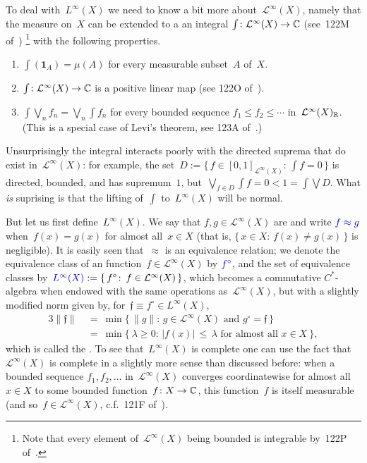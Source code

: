 \documentclass[a]{subfiles}
\begin{document}
\begin{parsec}
\begin{point}
\end{point}
\begin{point}%
To deal with~$L^\infty(X)$
we need to know a bit more about~$\mathcal{L}^\infty(X)$,
namely that the measure on~$X$ can be extended to a
an integral $\int\colon \mathcal{L}^\infty(X)\to \mathbb{C}$
(see~122M of~\cite{fremlin})%
\footnote{Note that every element of~$\mathcal{L}^\infty(X)$
being bounded is integrable by~122P of~\cite{fremlin}.}
with the following properties.
\begin{enumerate}
\item
$\int(\mathbf{1}_A) = \mu(A)$
for every measurable subset~$A$ of~$X$.
\item
$\int\colon \mathcal{L}^\infty(X)\to \mathbb{C}$
is a positive linear map
(see 122O of~\cite{fremlin}).
\item
$\int \bigvee_n f_n = \bigvee_n \int f_n$
for every bounded sequence
$f_1\leq f_2\leq \dotsb$
in~$\mathcal{L}^\infty(X)_{\mathbb{R}}$.
(This is a special case
of Levi's theorem, see 123A of~\cite{fremlin}.)
\end{enumerate}
Unsurprisingly the integral
interacts poorly
with the directed suprema
that do exist in~$\mathcal{L}^\infty(X)$:
for example, the set~$D:=\{\,f\in [0,1]_{\mathcal{L}^\infty(X)}\colon \,
\int f = 0\,\}$
is directed, bounded, and has supremum~$1$,
but~$\bigvee_{f\in D} \int f=0 < 1=\int \bigvee D$.
What \emph{is} suprising
is that the lifting of~$\int$
to~$L^\infty(X)$ will be normal.
\end{point}
\begin{point}%
But let us first define~$L^\infty(X)$.
We say that $f,g\in \mathcal{L}^\infty(X)$
are 
and write $\Define{f\approx g}$
when~$f(x)=g(x)$ for almost all~$x\in X$
(that is, $\{\,x\in X\colon\, f(x)\neq g(x)\,\}$
is negligible).
It is easily seen that~$\approx$ is an equivalence relation;
we denote the equivalence class
of an function~$f\in \mathcal{L}^\infty(X)$
by $\Define{f^\circ}$,
and
the set of equivalence classes by~$\Define{L^\infty(X)}
:= \{\, f^\circ\colon\, f\in \mathcal{L}^\infty(X)\,\}$,
which
becomes a commutative $C^*$-algebra
when
endowed with the same operations
as~$\mathcal{L}^\infty(X)$, but with
a slightly modified norm given by,
for~$\mathfrak{f}\equiv f^\circ \in L^\infty(X)$,
\begin{alignat*}{3}
	\|\mathfrak{f}\| \ &= \ 
\min\{\, \|g\|\colon \, g\in\mathcal{L}^\infty(X)\text{ and }
g^\circ = \mathfrak{f}\,\} \\
&=\ \min\{\ \lambda\geq 0\colon\,
		\left|f(x)\right|\,\leq\,\lambda
	\text{ for almost all~$x\in X$}\ \},
\end{alignat*}
which  is called the .
To see that~$L^\infty(X)$ is complete
one can use the fact that~$\mathcal{L}^\infty(X)$
is complete in a slightly more sense than discussed before:
when a bounded sequence $f_1,f_2,\dotsc$
in~$\mathcal{L}^\infty(X)$
converges coordinatewise for almost all~$x\in X$
to some bounded function~$f\colon X\to\mathbb{C}$,
this function~$f$ is itself measurable (and so~$f\in\mathcal{L}^\infty(X)$,
c.f.~121F of~\cite{fremlin}).


\end{point}
\end{parsec}
\end{document}
